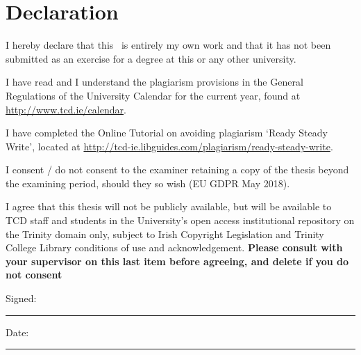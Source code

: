 \chapter*{Declaration}
\label{sec:Declaration} %

I hereby declare that this \typeofthesis\ is entirely my own work and that it has not been submitted as an exercise for a degree at this or any other university.

\vspace{0.5cm}
I have read and I understand the plagiarism provisions in the General Regulations of the University Calendar for the current year, found at \url{http://www.tcd.ie/calendar}.
\vspace{0.5cm}

I have completed the Online Tutorial on avoiding plagiarism `Ready Steady Write', located at \url{http://tcd-ie.libguides.com/plagiarism/ready-steady-write}.
\vspace{0.5cm}

I consent / do not consent to the examiner retaining a copy of the thesis beyond the examining period, should they so wish (EU GDPR May 2018).
\vspace{0.5cm}

I agree that this thesis will not be publicly available, but will be available to TCD staff and students in the University’s open access institutional repository on the Trinity domain only, subject to Irish Copyright Legislation and Trinity College Library conditions of use and acknowledgement.  \textbf{Please consult with your supervisor on this last item before agreeing, and delete if you do not consent}
\vspace{3cm}

Signed:~\rule{5cm}{0.3pt}\hfill Date:~\rule{5cm}{0.3pt}